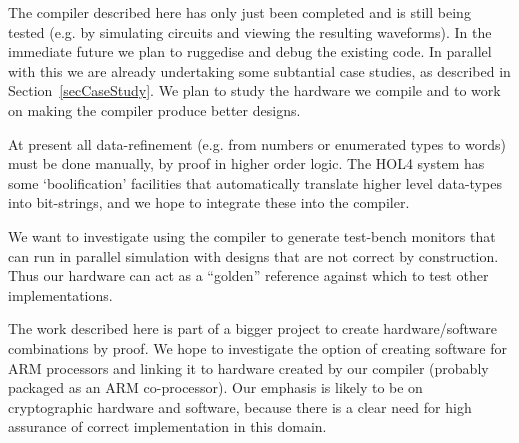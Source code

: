 
The compiler described here has only just been completed and is still
being tested (e.g. by simulating circuits and viewing the resulting
waveforms). In the immediate future we plan to ruggedise and debug the
existing code.  In parallel with this we are already undertaking some
subtantial case studies, as described in
Section~\ref{secCaseStudy}. We plan to study the hardware we compile
and to work on making the compiler produce better designs.

At present all data-refinement (e.g. from numbers or enumerated types
to words) must be done manually, by proof in higher order logic. The
HOL4 system has some `boolification' facilities that automatically
translate higher level data-types into bit-strings, and we hope to
integrate these into the compiler.

We want to investigate using the compiler to generate test-bench
monitors that can run in parallel simulation with designs that are not
correct by construction.  Thus our hardware can act as a ``golden''
reference against which to test other implementations.

The work described here is part of a bigger project to create
hardware/software combinations by proof.  We hope to investigate the
option of creating software for ARM processors and linking it to
hardware created by our compiler (probably packaged as an ARM
co-processor). Our emphasis is likely to be on cryptographic hardware
and software, because there is a clear need for high assurance of
correct implementation in this domain.
